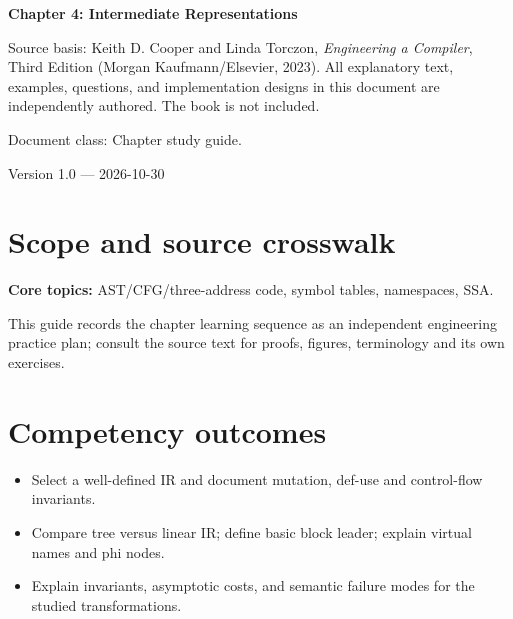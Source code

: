 \documentclass[10pt,letterpaper]{article}
\begin{document}
\begin{titlepage}
\centering\vspace*{1.0in}
{\Huge\bfseries\textcolor{CompilerBlue}{Chapter 4: Intermediate Representations}\par}
\vspace{.22in}{\Large Critical reading, original exercises, evidence and review\par}
\vspace{.4in}{\large Compiler Engineering Documentation Suite\par}
\vfill
\begin{minipage}{.86\linewidth}\small
Source basis: Keith D. Cooper and Linda Torczon, \emph{Engineering a Compiler}, Third Edition (Morgan Kaufmann/Elsevier, 2023). All explanatory text, examples, questions, and implementation designs in this document are independently authored. The book is not included.\par\medskip
Document class: Chapter study guide.
\end{minipage}
\vfill\textcolor{CompilerGray}{Version 1.0 --- 2026-10-30}\par
\end{titlepage}
\tableofcontents\clearpage
\section{Scope and source crosswalk}
\textbf{Core topics:} AST/CFG/three-address code, symbol tables, namespaces, SSA.

This guide records the chapter learning sequence as an independent engineering practice plan; consult the source text for proofs, figures, terminology and its own exercises.

\section{Competency outcomes}
\begin{itemize}
\item Select a well-defined IR and document mutation, def-use and control-flow invariants.
\item Compare tree versus linear IR; define basic block leader; explain virtual names and phi nodes.
\item Explain invariants, asymptotic costs, and semantic failure modes for the studied transformations.
\end{itemize}
\end{document}
